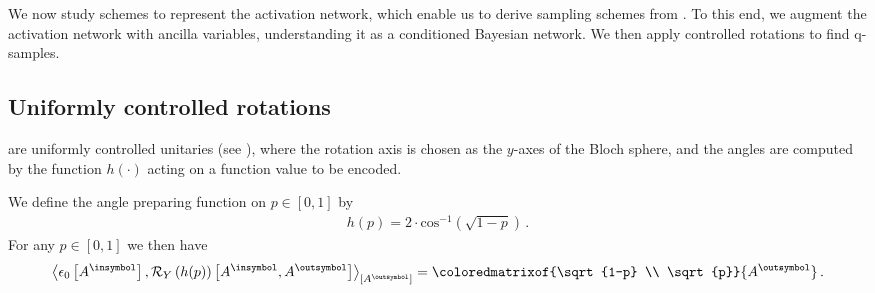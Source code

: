 \section{\ActivationCircuits{}}

We now study schemes to represent the activation network, which enable us to derive sampling schemes from \CompActNets{}.
To this end, we augment the activation network with ancilla variables, understanding it as a conditioned Bayesian network.
We then apply controlled rotations to find q-samples.

\subsection{Uniformly controlled rotations}

\ActivationCircuits{} are uniformly controlled unitaries (see \cite{mottonen_transformation_2005}), where the rotation axis is chosen as the $y$-axes of the Bloch sphere, and the angles are computed by the function $h(\cdot)$ acting on a function value to be encoded.

We define the angle preparing function on $p\in[0,1]$ by
\begin{align*}
    h(p) = 2 \cdot \mathrm{cos}^{-1}\left(\sqrt{1-p}\right) \, .
\end{align*}
For any $p\in[0,1]$ we then have
\begin{align*}
    \contractionof{\onehotmapofat{0}{\cavariable{\insymbol}},\yrotationofat{h(p)}{\cavariable{\insymbol},\cavariable{\outsymbol}}}{\cavariable{\outsymbol}}
    = \coloredmatrixof{\sqrt{1-p} \\ \sqrt{p}}{\cavariable{\outsymbol}} \, .
\end{align*}


